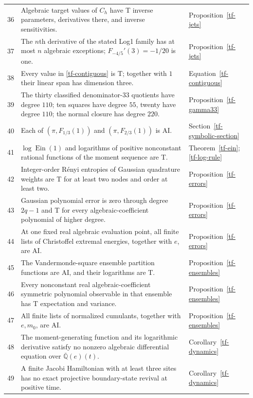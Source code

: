 \documentclass[11pt,a4paper]{article}
\theoremstyle{definition}
\theoremstyle{remark}
\numberwithin{equation}{section}
\newcommand{\Qbar}{\overline{\mathbb Q}}
\DeclareMathOperator{\Ein}{Ein}
\begin{document}
\begin{longtable}{@{}L{.055\textwidth}L{.68\textwidth}L{.205\textwidth}@{}}
36 & Algebraic target values of $C_h$ have T inverse parameters, derivatives there, and inverse sensitivities. & Proposition~\ref{tf-jets}\\
37 & The $n$th derivative of the stated Log1 family has at most $n$ algebraic exceptions; $F_{-4/5}'(3)=-1/20$ is one. & Proposition~\ref{tf-jets}\\
38 & Every value in \eqref{tf-contiguous} is T; together with $1$ their linear span has dimension three. & Equation~\eqref{tf-contiguous}\\
39 & The thirty classified denominator-$33$ quotients have degree $110$; ten squares have degree $55$, twenty have degree $110$; the normal closure has degree $220$. & Proposition~\ref{tf-gamma33}\\
40 & Each of $(\pi,F_{1/3}(1))$ and $(\pi,F_{2/3}(1))$ is AI. & Section~\ref{tf-symbolic-section}\\
41 & $\log\Ein(1)$ and logarithms of positive nonconstant rational functions of the moment sequence are T. & Theorem~\ref{tf-ein}; \eqref{tf-log-rule}\\
42 & Integer-order R\'enyi entropies of Gaussian quadrature weights are T for at least two nodes and order at least two. & Proposition~\ref{tf-errors}\\
43 & Gaussian polynomial error is zero through degree $2q-1$ and T for every algebraic-coefficient polynomial of higher degree. & Proposition~\ref{tf-errors}\\
44 & At one fixed real algebraic evaluation point, all finite lists of Christoffel extremal energies, together with $e$, are AI. & Proposition~\ref{tf-errors}\\
45 & The Vandermonde-square ensemble partition functions are AI, and their logarithms are T. & Proposition~\ref{tf-ensembles}\\
46 & Every nonconstant real algebraic-coefficient symmetric polynomial observable in that ensemble has T expectation and variance. & Proposition~\ref{tf-ensembles}\\
47 & All finite lists of normalized cumulants, together with $e,m_0$, are AI. & Proposition~\ref{tf-ensembles}\\
48 & The moment-generating function and its logarithmic derivative satisfy no nonzero algebraic differential equation over $\Qbar(e)(t)$. & Corollary~\ref{tf-dynamics}\\
49 & A finite Jacobi Hamiltonian with at least three sites has no exact projective boundary-state revival at positive time. & Corollary~\ref{tf-dynamics}\\

\end{longtable}
\end{document}
